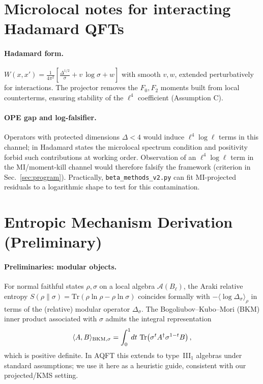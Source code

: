 \documentclass[aps,prd,onecolumn,superscriptaddress,nofootinbib]{revtex4-2}
\begin{document}
\section{Microlocal notes for interacting Hadamard QFTs}
\label{app:microlocal}
\paragraph{Hadamard form.}
\(W(x,x')=\frac{1}{4\pi^2}\left[\frac{\Delta^{\!1/2}}{\sigma}+v\,\log\sigma+w\right]\) with smooth \(v,w\), extended perturbatively for interactions. The projector removes the \(F_0,F_2\) moments built from local counterterms, ensuring stability of the \(\ell^4\) coefficient (Assumption C).

\paragraph{OPE gap and log-falsifier.}
Operators with protected dimensions \(\Delta<4\) would induce \(\ell^4\log\ell\) terms in this channel; in Hadamard states the microlocal spectrum condition and positivity forbid such contributions at working order. Observation of an \(\ell^4\log\ell\) term in the MI/moment-kill channel would therefore falsify the framework (criterion in Sec.~\ref{sec:program}). Practically, \texttt{beta\_methods\_v2.py} can fit MI-projected residuals to a logarithmic shape to test for this contamination.

\section{Entropic Mechanism Derivation (Preliminary)}
\label{app:entropic-proof}

\paragraph{Preliminaries: modular objects.}
For normal faithful states \(\rho,\sigma\) on a local algebra \(\mathcal A(B_\ell)\), the Araki relative entropy
\(S(\rho\|\sigma)=\mathrm{Tr}(\rho\ln\rho-\rho\ln\sigma)\) coincides formally with \(-\langle \log\Delta_\sigma\rangle_\rho\) in terms of the (relative) modular operator \(\Delta_\sigma\). The Bogoliubov–Kubo–Mori (BKM) inner product associated with \(\sigma\) admits the integral representation
\[
\langle A,B\rangle_{\rm BKM,\sigma}=\int_0^1\!dt~\mathrm{Tr}\!\left(\sigma^t A^\dagger \sigma^{1-t}B\right),
\]
which is positive definite. In AQFT this extends to type~III\(_1\) algebras under standard assumptions; we use it here as a heuristic guide, consistent with our projected/KMS setting.
\end{document}
